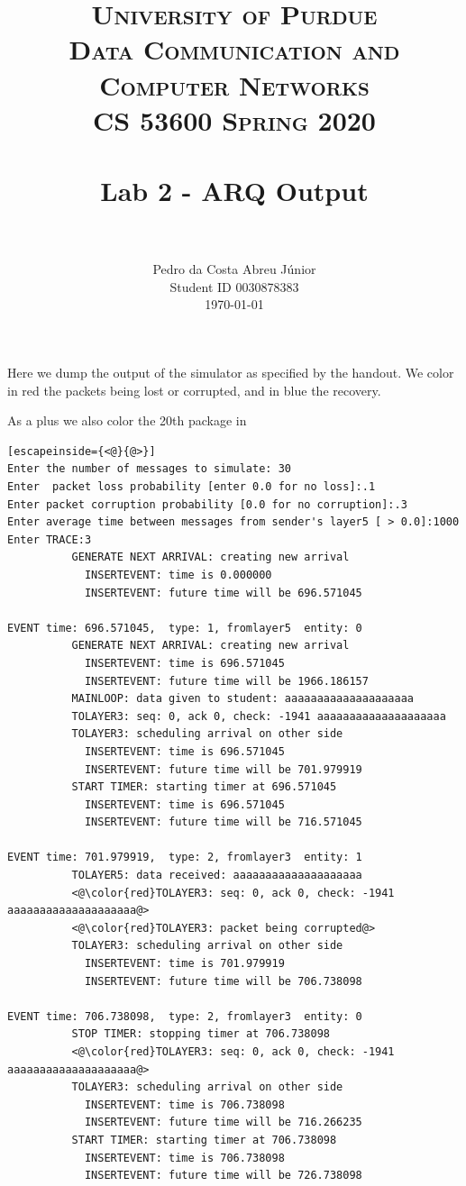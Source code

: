 \documentclass[paper=a4, fontsize=11pt]{scrartcl}
\title{
		\usefont{OT1}{bch}{b}{n}
		\normalfont \normalsize \textsc{University of Purdue\\
      Data Communication and Computer Networks\\
      CS 53600 Spring 2020} \\ [25pt]
		\horrule{0.5pt} \\[0.4cm]
		\huge Lab 2 - ARQ Output\\
		\horrule{2pt} \\[0.5cm]
}
\author{
		\normalfont\normalsize Pedro da Costa Abreu Júnior\\ [-5pt]
    \normalsize Student ID 0030878383\\[-5pt]
    \normalsize \today
}
\date{}
\numberwithin{equation}{section}		%
\numberwithin{figure}{section}			%
\numberwithin{table}{section}				%
\begin{document}
\maketitle

Here we dump the output of the simulator as specified by the handout. We color in {\color{red}red} the packets being lost or corrupted, and in {\color{blue}blue} the recovery.

As a plus we also color the 20th package in {\color{green}{green}}


\begin{lstlisting}[escapeinside={<@}{@>}]
Enter the number of messages to simulate: 30
Enter  packet loss probability [enter 0.0 for no loss]:.1
Enter packet corruption probability [0.0 for no corruption]:.3
Enter average time between messages from sender's layer5 [ > 0.0]:1000
Enter TRACE:3
          GENERATE NEXT ARRIVAL: creating new arrival
            INSERTEVENT: time is 0.000000
            INSERTEVENT: future time will be 696.571045

EVENT time: 696.571045,  type: 1, fromlayer5  entity: 0
          GENERATE NEXT ARRIVAL: creating new arrival
            INSERTEVENT: time is 696.571045
            INSERTEVENT: future time will be 1966.186157
          MAINLOOP: data given to student: aaaaaaaaaaaaaaaaaaaa
          TOLAYER3: seq: 0, ack 0, check: -1941 aaaaaaaaaaaaaaaaaaaa
          TOLAYER3: scheduling arrival on other side
            INSERTEVENT: time is 696.571045
            INSERTEVENT: future time will be 701.979919
          START TIMER: starting timer at 696.571045
            INSERTEVENT: time is 696.571045
            INSERTEVENT: future time will be 716.571045

EVENT time: 701.979919,  type: 2, fromlayer3  entity: 1
          TOLAYER5: data received: aaaaaaaaaaaaaaaaaaaa
          <@\color{red}TOLAYER3: seq: 0, ack 0, check: -1941 aaaaaaaaaaaaaaaaaaaa@>
          <@\color{red}TOLAYER3: packet being corrupted@>
          TOLAYER3: scheduling arrival on other side
            INSERTEVENT: time is 701.979919
            INSERTEVENT: future time will be 706.738098

EVENT time: 706.738098,  type: 2, fromlayer3  entity: 0
          STOP TIMER: stopping timer at 706.738098
          <@\color{red}TOLAYER3: seq: 0, ack 0, check: -1941 aaaaaaaaaaaaaaaaaaaa@>
          TOLAYER3: scheduling arrival on other side
            INSERTEVENT: time is 706.738098
            INSERTEVENT: future time will be 716.266235
          START TIMER: starting timer at 706.738098
            INSERTEVENT: time is 706.738098
            INSERTEVENT: future time will be 726.738098


\end{lstlisting}
\end{document}
